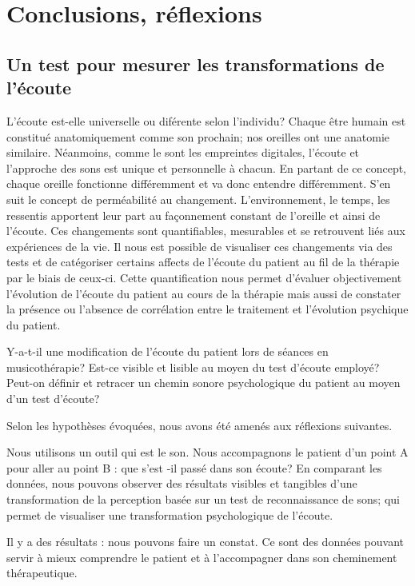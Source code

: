 \chapter{Conclusions, réflexions}

 
\section{Un test pour mesurer les trans\-for\-ma\-tions de l'écoute}

L'écoute est-elle universelle ou diférente selon l'individu?
 Chaque être humain est constitué anatomiquement comme son prochain;
 nos oreilles ont  une anatomie similaire. Néanmoins, comme le sont 
les empreintes digitales, l'écoute et l'approche des sons est unique
et personnelle à chacun. En partant de ce concept, chaque oreille
fonctionne différemment et va donc entendre différemment. S'en suit le concept de perméabilité au
changement. L'environnement, le temps, les ressentis apportent leur
part au façonnement constant de l'oreille et ainsi de l'écoute. Ces
changements sont quantifiables, mesurables et se retrouvent liés aux
expériences de la vie. Il nous est possible de visualiser ces
changements via des tests et de catégoriser certains affects de
l'écoute du patient au fil de la thérapie par le biais de
ceux-ci. Cette quantification nous permet d'évaluer objectivement
l'évolution de l'écoute du patient au cours de la thérapie  mais aussi
de constater la présence ou l'absence de corrélation entre le
traitement et l'évolution psychique du patient.

Y-a-t-il une modification de l'écoute du patient lors de séances en musicothérapie?
Est-ce visible et lisible au moyen du test d'écoute employé?
Peut-on définir et retracer un chemin sonore psychologique du patient au moyen d'un test d'écoute?


Selon les hypothèses évoquées, nous avons été amenés aux réflexions suivantes.

Nous utilisons un outil qui est le son. Nous accompagnons
le patient d'un point A pour aller au point B : que s'est -il passé
dans son écoute?
En comparant les données, nous pouvons observer des résultats visibles et tangibles 
d'une transformation de la
perception basée sur un test de reconnaissance de sons;  qui permet de visualiser une transformation psychologique
de l'écoute. 


Il y a des résultats : nous pouvons faire un constat.
Ce sont des données pouvant servir à mieux comprendre le patient
et à l'accompagner dans son cheminement thérapeutique.


